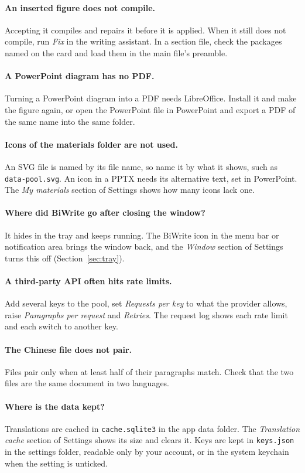 \documentclass[a4paper,11pt]{article}
\newcommand{\ui}[1]{\emph{#1}}
\begin{document}
\paragraph{An inserted figure does not compile.} Accepting it compiles and repairs it before it is applied. When it still does not compile, run \ui{Fix} in the writing assistant. In a section file, check the packages named on the card and load them in the main file's preamble.

\paragraph{A PowerPoint diagram has no PDF.} Turning a PowerPoint diagram into a PDF needs LibreOffice. Install it and make the figure again, or open the PowerPoint file in PowerPoint and export a PDF of the same name into the same folder.

\paragraph{Icons of the materials folder are not used.} An SVG file is named by its file name, so name it by what it shows, such as \texttt{data-pool.svg}. An icon in a PPTX needs its alternative text, set in PowerPoint. The \ui{My materials} section of Settings shows how many icons lack one.

\paragraph{Where did BiWrite go after closing the window?} It hides in the tray and keeps running. The BiWrite icon in the menu bar or notification area brings the window back, and the \ui{Window} section of Settings turns this off (Section~\ref{sec:tray}).

\paragraph{A third-party API often hits rate limits.} Add several keys to the pool, set \ui{Requests per key} to what the provider allows, raise \ui{Paragraphs per request} and \ui{Retries}. The request log shows each rate limit and each switch to another key.

\paragraph{The Chinese file does not pair.} Files pair only when at least half of their paragraphs match. Check that the two files are the same document in two languages.

\paragraph{Where is the data kept?} Translations are cached in \texttt{cache.sqlite3} in the app data folder. The \ui{Translation cache} section of Settings shows its size and clears it. Keys are kept in \texttt{keys.json} in the settings folder, readable only by your account, or in the system keychain when the setting is unticked.
\end{document}
